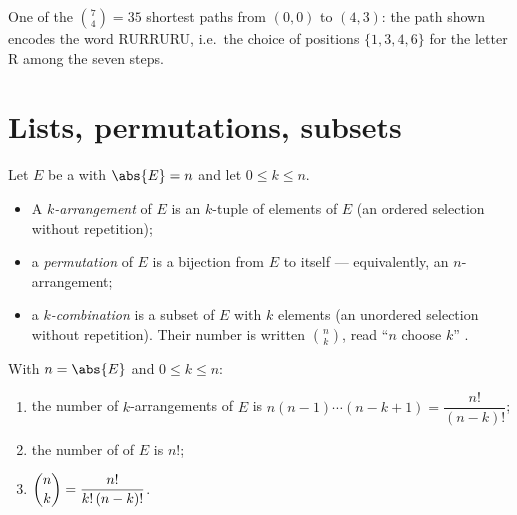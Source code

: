 \begin{omfigure}

{\small One of the $\binom74 = 35$ shortest paths from $(0,0)$ to
$(4,3)$: the path shown encodes the word RURRURU, i.e.\ the choice
of positions $\{1,3,4,6\}$ for the letter R among the seven
steps.}
\end{omfigure}

\section{Lists, permutations, subsets}

\begin{definition}\label{def:b1:counting:objects}
Let $E$ be a  with $\abs{E} = n$ and let $0 \leq k \leq n$.
\begin{itemize}
  \item A \emph{$k$-arrangement} of $E$ is an  $k$-tuple of
        elements of $E$ (an ordered selection without repetition);
  \item a \emph{permutation} of $E$ is a bijection
        from $E$ to itself --- equivalently, an $n$-arrangement;
  \item a \emph{$k$-combination} is a subset of $E$ with $k$ elements
        (an unordered selection without repetition). Their number is
        written $\binom{n}{k}$, read ``$n$ choose $k$''
        .
\end{itemize}
\end{definition}

\begin{theorem}\label{thm:b1:counting:counts}
With $n = \abs{E}$ and $0 \leq k \leq n$:
\begin{enumerate}
  \item the number of $k$-arrangements of $E$ is $n (n-1) \cdots
        (n-k+1) = \dfrac{n!}{(n-k)!}$;
  \item the number of  of $E$ is $n!$;
  \item $\dbinom{n}{k} = \dfrac{n!}{k!\,(n-k)!}$.
\end{enumerate}
\end{theorem}

